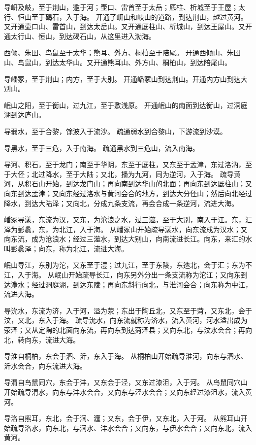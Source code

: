 \documentclass[12pt,UTF8]{ctexbook}
\begin{document}
导岍及岐，至于荆山，逾于河；壶口、雷首至于太岳；厎柱、析城至于王屋；太行、恒山至于碣石，入于海。
开通了岍山和岐山的道路，到达荆山，越过黄河。又开通壶口山、雷首山，到达太岳山。又开通厎柱山、析城山，到达王屋山。又开通太行山、恒山，到达碣石山，从这里进入渤海。

西倾、朱圉、鸟鼠至于太华；熊耳、外方、桐柏至于陪尾。
开通西倾山、朱圉山、鸟鼠山，到达太华山。又开通熊耳山、外方山、桐柏山，到达陪尾山。

导嶓冢，至于荆山；内方，至于大别。
开通嶓冢山到达荆山。开通内方山到达大别山。

岷山之阳，至于衡山，过九江，至于敷浅原。
开通岷山的南面到达衡山，过洞庭湖到达庐山。

导弱水，至于合黎，馀波入于流沙。
疏通弱水到合黎山，下游流到沙漠。

导黑水，至于三危，入于南海。
疏通黑水到三危山，流入南海。

导河、积石，至于龙门；南至于华阴，东至于厎柱，又东至于孟津，东过洛汭，至于大伾；北过降水，至于大陆；又北，播为九河，同为逆河，入于海。
疏导黄河，从积石山开始，到达龙门山；再向南到达华山的北面；再向东到达厎柱山；又向东到达孟津；又向东经过洛水与黄河会合的地方，到达大分伾山；然后向北经过降水，到达大陆泽；又向北，分成九条支流，再会合成一条逆河，流进大海。

嶓冢导漾，东流为汉，又东，为沧浪之水，过三澨，至于大别，南入于江。东，汇泽为彭蠡，东，为北江，入于海。
从嶓冢山开始疏导漾水，向东流成为汉水；又向东流，成为沧浪水；经过三澨水，到达大别山，向南流进长江。向东，来汇的水叫彭蠡泽；向东，称为北江，流进大海。

岷山导江，东别为沱，又东至于澧；过九江，至于东陵，东迆北，会于汇；东为不江，入于海。
从岷山开始疏导长江，向东另外分出一条支流称为沱江；又向东到达澧水；经过洞庭湖，到达东陵；再向东斜行向北，与淮河会合；向东称为中江，流进大海。

导沇水，东流为济，入于河，溢为荥；东出于陶丘北，又东至于菏，又东北，会于汶，又北，东入于海。
疏导沇水，向东流就称为济水，流入黄河，河水溢出成为荥泽；又从定陶的北面向东流，再向东到达菏泽县；又向东北，与汶水会合；再向北，转向东，流进大海。

导淮自桐柏，东会于泗、沂，东入于海。
从桐柏山开始疏导淮河，向东与泗水、沂水会合，向东流进大海。

导渭自鸟鼠同穴，东会于沣，又东会于泾，又东过漆沮，入于河。
从鸟鼠同穴山开始疏导渭水，向东与沣水会合，又向东与泾水会合；又向东经过漆沮水，流入黄河。

导洛自熊耳，东北，会于涧、瀍；又东，会于伊，又东北，入于河。
从熊耳山开始疏导洛水，向东北，与涧水、沣水会合；又向东，与伊水会合；又向东北，流入黄河。
\end{document}
